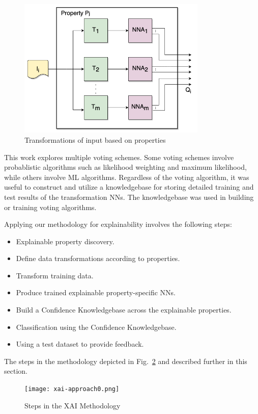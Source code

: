 \documentclass[conference]{IEEEtran}
\begin{document}
 \begin{figure}[htbp]
\centerline{\includegraphics[width=90mm]{./images/property_transforms.png}}
\caption{Transformations of input based on properties}
\label{proptrans}
\end{figure}

This work explores multiple voting schemes\cite{blough}.  Some voting schemes involve probablistic algorithms such as likelihood weighting and maximum likelihood, while others involve ML algorithms.  Regardless of the voting algorithm, it was useful to construct and utilize a knowledgebase for storing detailed training and test results of the transformation NNs.  The knowledgebase was used in building or training voting algorithms. 
 
Applying our methodology for explainability involves the following steps:
\begin{itemize}
\item Explainable property discovery.
\item Define data transformations according to properties.
\item Transform training data.
\item Produce trained explainable property-specific NNs.
\item Build a Confidence Knowledgebase across the explainable properties.
\item Classification using the Confidence Knowledgebase.
\item Using a test dataset to provide feedback.
\end{itemize}

The steps in the methodology depicted in Fig.~\ref{xaimeth} and described further in this section.

\begin{figure}[htbp]
\centerline{\texttt{[image: xai-approach0.png]}}
\caption{Steps in the XAI Methodology}
\label{xaimeth}
\end{figure}
\end{document}
